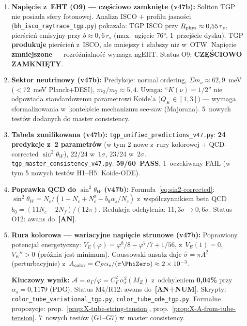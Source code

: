 \begin{remark}
\begin{enumerate}[nosep]
  \item \textbf{Napi\k{e}cie z~EHT (O9) --- cz\k{e}\'sciowo zamkni\k{e}te (v47b):}
    Soliton TGP nie posiada sfery fotonowej.
    Analiza ISCO + profilu jasno\'sci
    (\texttt{bh\_isco\_raytrace\_tgp.py}) pokaza\l{}a:
    TGP ISCO przy $R_{\rm phys} \approx 0{,}55\,r_s$,
    pier\'scie\'n emisyjny przy $b \approx 0{,}6\,r_s$ (max.\ ugięcie $76°$, 1~przej\'scie dysku).
    TGP \textbf{produkuje} pier\'scie\'n z~ISCO, ale mniejszy i~s\l{}abszy ni\.z w~OTW.
    Napi\k{e}cie \textbf{zmniejszone} --- rozr\'o\.znialno\'s\'c wymaga ngEHT.
    Status O9: \textbf{CZ\k{E}\'SCIOWO ZAMKNI\k{E}TY}.

  \item \textbf{Sektor neutrinowy (v47b):}
    Predykcje: normal ordering, $\Sigma m_\nu \approx 62{,}9$~meV
    ($< 72$~meV Planck+DESI), $m_3/m_2 \approx 5{,}4$.
    Uwaga: ``$K(\nu) = 1/2$'' nie odpowiada standardowemu
    parametrowi Koide'a ($Q_K \in [1,3]$) --- wymaga sformalizowania
    w~kontek\'scie mechanizmu see-saw (Majorana).
    5~nowych test\'ow dodanych do master consistency.

  \item \textbf{Tabela zunifikowana (v47b):}
    \texttt{tgp\_unified\_predictions\_v47.py}:
    \textbf{24 predykcje z~2 parametr\'ow} (w tym 2 nowe z~rury kolorowej + QCD-corrected $\sin^2\theta_W$),
    22/24 w~$1\sigma$, 23/24 w~$2\sigma$.
    \texttt{tgp\_master\_consistency\_v47.py}:
    \textbf{59/60~PASS}, 1~oczekiwany FAIL
    (w tym 5 nowych test\'ow H1--H5: Koide-ODE).

  \item \textbf{Poprawka QCD do $\sin^2\theta_W$ (v47b):}
    Formu\l{}a~\eqref{eq:sin2-corrected}: $\sin^2\theta_W
    = N_c/(1+N_c+N_c^2 - b_0\alpha_s/N_c)$ z~wsp\'o\l{}czynnikiem
    beta QCD $b_0 = (11N_c{-}2N_f)/(12\pi)$.
    Redukcja odchylenia: \textbf{$11{,}3\sigma \to 0{,}6\sigma$}.
    Status O12: awans do~\textbf{[AN]}.

  \item \textbf{Rura kolorowa --- wariacyjne napi\k{e}cie strunowe (v47b):}
    Poprawiony potencja\l{} energetyczny:
    $V_E(\varphi) = \varphi^8/8 - \varphi^7/7 + 1/56$,
    z~$V_E(1) = 0$, $V_E'' > 0$ (pr\'o\.znia jest minimum).
    Gaussowski ansatz daje $\hat\sigma = \pi A^2$ (perturbacyjnie)
    z~$A_{\rm color} = C_F\alpha_s/(\pi\PhiZero) \approx 2 \times 10^{-3}$.

    \textbf{Kluczowy wynik:}
    $\mathcal{A} = a_\Gamma/\varphi = C_F^2\,\alpha_s^2(M_Z)$
    z~odchyleniem \textbf{0{,}04\%} przy $\alpha_s = 0{,}1179$ (PDG).
    Status M4/R12: awans do~\textbf{[AN+NUM]}.
    Skrypty: \texttt{color\_tube\_variational\_tgp.py},
    \texttt{color\_tube\_ode\_tgp.py}.
    Formalne propozycje: prop.~\ref{prop:X-tube-string-tension},
    prop.~\ref{prop:X-A-from-tube-tension}.
    7~nowych test\'ow (G1--G7) w~master consistency.


\end{enumerate}
\end{remark}

